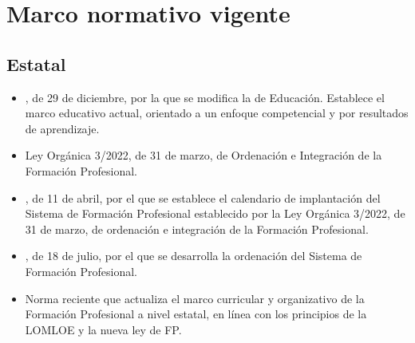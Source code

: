  
 \section*{Marco normativo vigente}
 \label{sec:marco-normativo}
 
 \subsection*{Estatal}
 \label{sec:normativa-estatal}

 \begin{itemize}
     \item \label{ley:lomloe_l}, de 29 de diciembre, por la que se modifica la \label{ley:loe_l} de Educación.  Establece el marco educativo actual, orientado a un enfoque competencial y por resultados de aprendizaje.
 
     \item \label{ley:nueva-fp_l} Ley Orgánica 3/2022, de 31 de marzo, de Ordenación e Integración de la Formación Profesional.
 
    \item \label{rd:278-2023_l}, de 11 de abril, por el que se establece el calendario de implantación del Sistema de Formación Profesional establecido por la Ley Orgánica 3/2022, de 31 de marzo, de ordenación e integración de la Formación Profesional.

     \item \label{rd:659-2023_l}, de 18 de julio, por el que se desarrolla la ordenación del Sistema de Formación Profesional.
 
     \item \label{rd:500-2024_l} Norma reciente que actualiza el marco curricular y organizativo de la Formación Profesional a nivel estatal, en línea con los principios de la LOMLOE y la nueva ley de FP.
 

\end{itemize}
